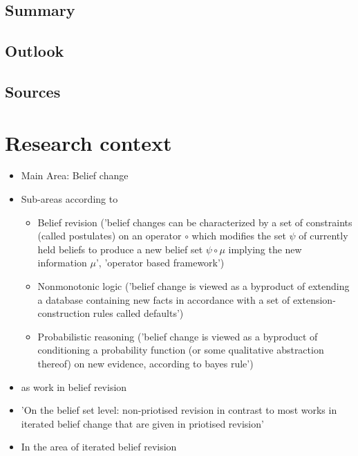 \documentclass[11pt]{article}
\begin{document}
\subsection{Summary}
\subsection{Outlook}
\subsection{Sources}

\section{Research context}
\begin{itemize}
    \item Main Area: Belief change
    \item Sub-areas according to \cite{Darwiche1997}
    \begin{itemize}
        \item Belief revision ('belief changes can be characterized by a set of constraints (called postulates) on an operator $\circ$ which modifies the set $\psi$ of currently held beliefs to produce a new belief set $\psi \circ \mu$ implying the new information $\mu$', 'operator based framework')
        \item Nonmonotonic logic ('belief change is viewed as a byproduct of extending a database containing new facts in accordance with a set of extension-construction rules called defaults') 
        \item Probabilistic reasoning ('belief change is viewed as a byproduct of conditioning a probability function (or some qualitative abstraction thereof) on new evidence, according to bayes rule')
    \end{itemize}
    \item \cite{Booth2011} as work in belief revision
    \item 'On the belief set level: \gls{non-priotised revision} in contrast to most works in iterated belief change that are given in priotised revision' \cite{Booth2011}
    \item In the area of \gls{iterated belief revision} \cite{Booth2011}
\end{itemize}
\end{document}
